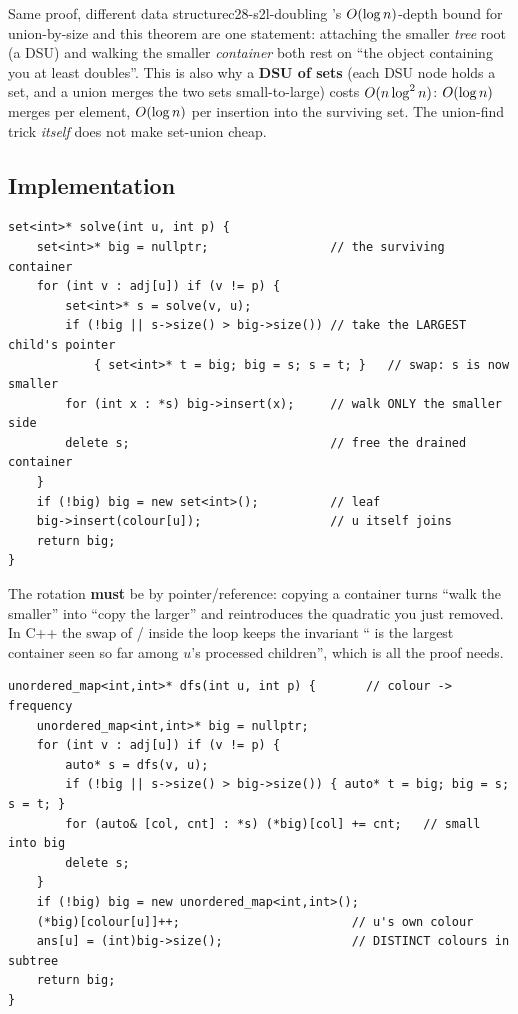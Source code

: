 \begin{proposition}{Same proof, different data structure}{c28-s2l-doubling}
's \(O(\log n)\)-depth bound for union-by-size and this
theorem are one statement: attaching the smaller \emph{tree} root (a DSU) and
walking the smaller \emph{container} both rest on ``the object containing you
at least doubles''.  This is also why a \textbf{DSU of sets} (each DSU node
holds a set, and a union merges the two sets small-to-large) costs
\(O(n\log^2 n)\): \(O(\log n)\) merges per element, \(O(\log n)\)
per insertion into the surviving set.  The union-find trick \emph{itself} does
not make set-union cheap.
\end{proposition}

\subsection{Implementation}

\begin{lstlisting}[caption={the merge mechanics: hand the biggest child container upward, pour the rest into it}, label={lst:c28-s2l}]
set<int>* solve(int u, int p) {
    set<int>* big = nullptr;                 // the surviving container
    for (int v : adj[u]) if (v != p) {
        set<int>* s = solve(v, u);
        if (!big || s->size() > big->size()) // take the LARGEST child's pointer
            { set<int>* t = big; big = s; s = t; }   // swap: s is now smaller
        for (int x : *s) big->insert(x);     // walk ONLY the smaller side
        delete s;                            // free the drained container
    }
    if (!big) big = new set<int>();          // leaf
    big->insert(colour[u]);                  // u itself joins
    return big;
}
\end{lstlisting}

The rotation \textbf{must} be by pointer/reference: copying a container turns
``walk the smaller'' into ``copy the larger'' and reintroduces the quadratic
you just removed.  In C++ the swap of / inside the loop keeps
the invariant `` is the largest container seen so far among \(u\)'s
processed children'', which is all the proof needs.

\begin{lstlisting}[caption={the same idea as a DP returning by value, with the answer read at each node (hash container version)}, label={lst:c28-s2l-dp}]
unordered_map<int,int>* dfs(int u, int p) {       // colour -> frequency
    unordered_map<int,int>* big = nullptr;
    for (int v : adj[u]) if (v != p) {
        auto* s = dfs(v, u);
        if (!big || s->size() > big->size()) { auto* t = big; big = s; s = t; }
        for (auto& [col, cnt] : *s) (*big)[col] += cnt;   // small into big
        delete s;
    }
    if (!big) big = new unordered_map<int,int>();
    (*big)[colour[u]]++;                        // u's own colour
    ans[u] = (int)big->size();                  // DISTINCT colours in subtree
    return big;
}
\end{lstlisting}

